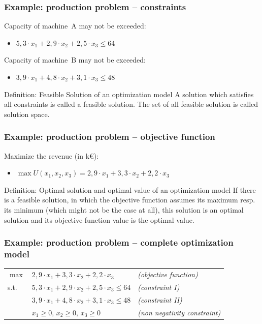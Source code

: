 \begin{frame}
 \frametitle{Example: production problem -- constraints}
  
  Capacity of machine~A may not be exceeded:
  \begin{itemize}
   \item $5,3 \cdot x_1 + 2,9 \cdot x_2 + 2,5 \cdot x_3 \leq 64$
  \end{itemize}

  Capacity of machine~B may not be exceeded:
  \begin{itemize}
   \item $3,9 \cdot x_1 + 4,8 \cdot x_2 + 3,1 \cdot x_3 \leq 48$
  \end{itemize}
 
 \begin{block}{Definition: Feasible Solution of an optimization model}
  A solution which satisfies all constraints is called a feasible solution. The set of all feasible solution is called solution space. 
 \end{block}
\end{frame}

\begin{frame}
 \frametitle{Example: production problem -- objective function}
 Maximize the revenue (in k€):
 \begin{itemize}
  \item $\max U(x_1, x_2, x_3) = 2,9\cdot x_1 + 3,3\cdot x_2 + 2,2\cdot x_3$
 \end{itemize}
 
 \begin{block}{Definition: Optimal solution and optimal value of an optimization model}
  If there is a feasible solution, in which the objective function assumes its maximum resp. its minimum (which might not be the case at all), this solution is an optimal solution and its objective function value is the optimal value.
 \end{block}
\end{frame}

\begin{frame}\small
 \frametitle{Example: production problem -- complete optimization model}
 \begin{tabularx}{\linewidth}{ll@{\quad}>{\itshape\footnotesize}X}
 $\max$ & $2,9\cdot x_1 + 3,3\cdot x_2 + 2,2\cdot x_3$ & (objective function)\\
 s.t. & $5,3\cdot x_1 + 2,9\cdot x_2 + 2,5\cdot x_3 \leq 64$ & (constraint I)\\
      & $3,9\cdot x_1 + 4,8\cdot x_2 + 3,1\cdot x_3 \leq 48$ & (constraint II)\\
      & $x_1\geq0,\,x_2\geq0,\,x_3\geq0$ & (non negativity constraint)\\
\end{tabularx}
\end{frame}




